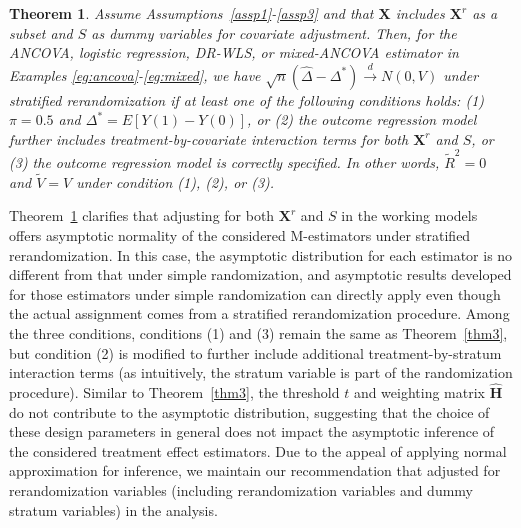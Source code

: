 \documentclass[12pt]{article}
\newtheorem{theorem}{Theorem}
\newcommand{\bX}{\boldsymbol{X}}\newcommand{\bO}{\boldsymbol{O}}
\begin{document}
{\begin{theorem}\label{thm4}
Assume Assumptions~\ref{assp1}-\ref{assp3} and that $\bX$ includes $\bX^r$ as a subset and $S$ as dummy variables for covariate adjustment.  Then, for the ANCOVA, logistic regression, DR-WLS, or mixed-ANCOVA estimator in Examples \ref{eg:ancova}-\ref{eg:mixed}, we have $\sqrt{n}(\widehat{\Delta} - \Delta^*) \xrightarrow{d} N(0,V)$ under stratified rerandomization if at least one of the following conditions holds: (1) $\pi = 0.5$ and $\Delta^* = E[Y(1)-Y(0)]$, or (2) the outcome regression model further includes treatment-by-covariate interaction terms for both $\bX^r$ and $S$, or (3) the outcome regression model is correctly specified. In other words, $\widetilde{R}^2=0$ and $\widetilde{V} = V$ under condition (1), (2), or (3).    
\end{theorem}

Theorem~\ref{thm4} clarifies that adjusting for both $\bX^r$ and $S$ in the working models offers asymptotic normality of the considered M-estimators under stratified rerandomization. In this case, the asymptotic distribution for each estimator is no different from that under simple randomization, and asymptotic results developed for those estimators under simple randomization can directly apply even though the actual assignment comes from a stratified rerandomization procedure. %
Among the three conditions, conditions (1) and (3) remain the same as Theorem~\ref{thm3}, but condition (2) is modified to further include additional treatment-by-stratum interaction terms (as intuitively, the stratum variable is part of the randomization procedure). Similar to Theorem~\ref{thm3}, the threshold $t$ and weighting matrix $\widehat{\mathbf{H}}$ do not contribute to the asymptotic distribution, suggesting that the choice of these design parameters in general does not impact the asymptotic inference of the considered treatment effect estimators. %
Due to the appeal of applying normal approximation for inference, we maintain our recommendation that adjusted for rerandomization variables (including rerandomization variables and dummy stratum variables) in the analysis. 



}
\end{document}
